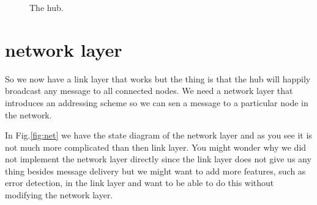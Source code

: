 \documentclass[a4paper,11pt]{article}
\begin{document}
\begin{figure}
\centering  
{}
\caption{The hub.}
\label{fig:hub}
\end{figure}



\section{network layer}

So we now have a link layer that works but the thing is that the hub
will happily broadcast any message to all connected nodes. We need a
network layer that introduces an addressing scheme so we can sen a
message to a particular node in the network.

In Fig.\ref{fig:net} we have the state diagram of the network layer
and as you see it is not much more complicated than then link
layer. You might wonder why we did not implement the network layer
directly since the link layer does not give us any thing besides
message delivery but we might want to add more features, such as error
detection, in the link layer and want to be able to do this without
modifying the network layer.
\end{document}

